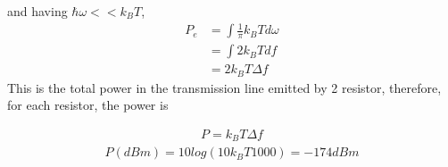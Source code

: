 \documentclass[a4paper]{article}
\begin{document}
and having $\hbar \omega << k_B T$,
\begin{align*}
	P_e	& = \int \frac{1}{ \pi} k_B T d \omega\\
	    & = \int 2 k_B T df\\
	    & = 2 k_B T \Delta f
\end{align*}
This is the total power in the transmission line emitted by 2 resistor, therefore, for each resistor, the power is

\begin{align*}
	P = k_B T \Delta f
\end{align*}
\begin{align*}
	P(dBm) = 10 log (10 k_B T 1000) = -174dBm 
\end{align*}
\end{document}
